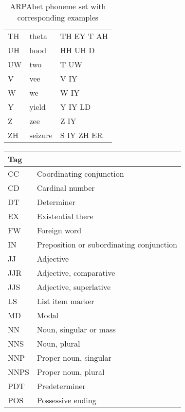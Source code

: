 \begin{table}
\begin{tabular}{|l|l|l|}
    TH      & theta   & TH EY T AH  \\
    UH      & hood    & HH UH D     \\
    UW      & two     & T UW        \\
    V       & vee     & V IY        \\
    W       & we      & W IY        \\
    Y       & yield   & Y IY LD     \\
    Z       & zee     & Z IY        \\
    ZH      & seizure & S IY ZH ER  \\ \hline
    \end{tabular}
    \caption{ARPAbet phoneme set with corresponding examples}
    \label{tab:arpa}
\end{table}
\begin{table}
    \begin{tabular}{|l|l|}
    \hline
    Tag  & ~                                        \\ \hline
    CC   & Coordinating conjunction                 \\
    CD   & Cardinal number                          \\
    DT   & Determiner                               \\
    EX   & Existential there                        \\
    FW   & Foreign word                             \\
    IN   & Preposition or subordinating conjunction \\
    JJ   & Adjective                                \\
    JJR  & Adjective, comparative                   \\
    JJS  & Adjective, superlative                   \\
    LS   & List item marker                         \\
    MD   & Modal                                    \\
    NN   & Noun, singular or mass                   \\
    NNS  & Noun, plural                             \\
    NNP  & Proper noun, singular                    \\
    NNPS & Proper noun, plural                      \\
    PDT  & Predeterminer                            \\
    POS  & Possessive ending                        \\

\end{tabular}
\end{table}
